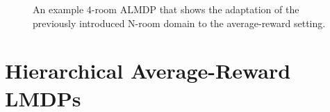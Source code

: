 \begin{figure}
  \begin{center}
  
  \end{center}
  \caption{An example $4$-room ALMDP that shows the adaptation of the previously introduced N-room domain to the average-reward setting. \\}
  \label{fig:ex}
\end{figure}

\section{Hierarchical Average-Reward LMDPs}

